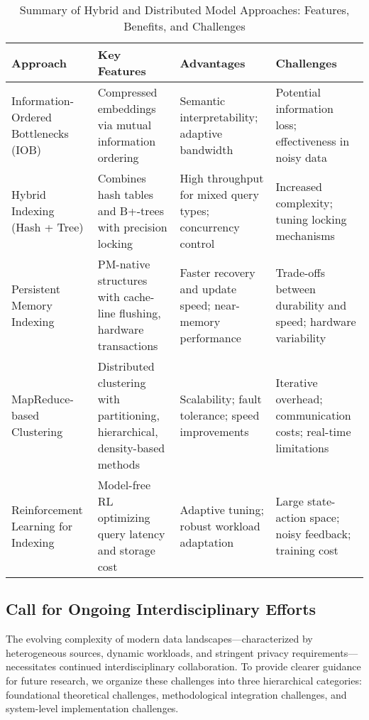 \documentclass[sigconf]{acmart}
\begin{document}
\begin{table*}[htbp]
\centering
\caption{Summary of Hybrid and Distributed Model Approaches: Features, Benefits, and Challenges}
\label{tab:hybrid_distributed_models}
\begin{adjustbox}{max width=\textwidth}
\begin{tabular}{@{}llll@{}}
\toprule
\textbf{Approach} & \textbf{Key Features} & \textbf{Advantages} & \textbf{Challenges} \\ \midrule
Information-Ordered Bottlenecks (IOB) \cite{ref22} & Compressed embeddings via mutual information ordering & Semantic interpretability; adaptive bandwidth & Potential information loss; effectiveness in noisy data \\[6pt]
Hybrid Indexing (Hash + Tree) \cite{ref35} & Combines hash tables and B+-trees with precision locking & High throughput for mixed query types; concurrency control & Increased complexity; tuning locking mechanisms \\[6pt]
Persistent Memory Indexing \cite{ref27} & PM-native structures with cache-line flushing, hardware transactions & Faster recovery and update speed; near-memory performance & Trade-offs between durability and speed; hardware variability \\[6pt]
MapReduce-based Clustering \cite{ref16} & Distributed clustering with partitioning, hierarchical, density-based methods & Scalability; fault tolerance; speed improvements & Iterative overhead; communication costs; real-time limitations \\[6pt]
Reinforcement Learning for Indexing \cite{ref33} & Model-free RL optimizing query latency and storage cost & Adaptive tuning; robust workload adaptation & Large state-action space; noisy feedback; training cost \\
\bottomrule
\end{tabular}
\end{adjustbox}
\end{table*}

\subsection{Call for Ongoing Interdisciplinary Efforts}

The evolving complexity of modern data landscapes---characterized by heterogeneous sources, dynamic workloads, and stringent privacy requirements---necessitates continued interdisciplinary collaboration. To provide clearer guidance for future research, we organize these challenges into three hierarchical categories: foundational theoretical challenges, methodological integration challenges, and system-level implementation challenges.
\end{document}
